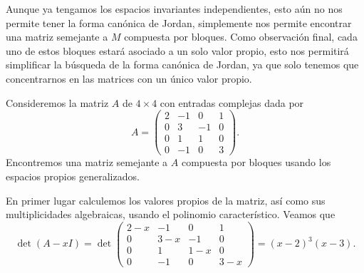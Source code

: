 Aunque ya tengamos los espacios invariantes independientes, esto aún no nos permite tener la forma canónica de Jordan, simplemente nos permite encontrar una matriz semejante a $M$ compuesta por bloques. Como observación final, cada uno de estos bloques estará asociado a un solo valor propio, esto nos permitirá simplificar la búsqueda de la forma canónica de Jordan, ya que solo tenemos que concentrarnos en las matrices con un único valor propio.

\begin{example}
  Consideremos la matriz $A$ de $4\times 4$ con entradas complejas dada por
    \[
      A = \begin{pmatrix}
        2 & -1 & 0 & 1 \\
        0 & 3 & -1 & 0 \\
        0 & 1 & 1 & 0 \\
        0 & -1 & 0 & 3
      \end{pmatrix}.
    \]
  Encontremos una matriz semejante a $A$ compuesta por bloques usando los espacios propios generalizados.

  \examplesolution

  En primer lugar calculemos los valores propios de la matriz, así como sus multiplicidades algebraicas, usando el polinomio característico. Veamos que
  \[
    \det(A-xI) = \det\begin{pmatrix}
      2-x & -1 & 0 & 1 \\
      0 & 3-x & -1 & 0 \\
      0 & 1 & 1-x & 0 \\
      0 & -1 & 0 & 3-x
    \end{pmatrix}
      = (x-2)^3 (x-3).
  \] 


\end{example}
